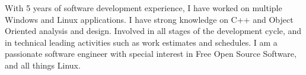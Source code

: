 

\begin{cvparagraph}

With 5 years of software development experience, I have worked on multiple Windows and Linux applications. I have strong knowledge on C++ and Object Oriented analysis and design. Involved in all stages of the development cycle, and in technical leading activities such as work estimates and schedules. I am a passionate software engineer with special interest in Free Open Source Software, and all things Linux.

\end{cvparagraph}
